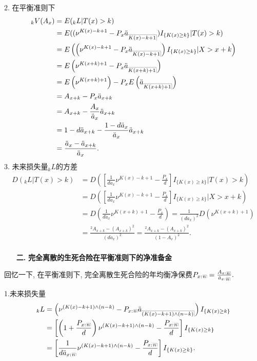 \documentclass[a4paper,openany, 10pt]{ctexbook}
\makeatletter
\newcommand{\hei}{\CJKfamily{hei}}      %
\def\z{\left}
\def\y{\right}
\DeclareRobustCommand{\annu}[1]{_{%
    \def\arraystretch{0}%
    \setlength\arraycolsep{1pt}%
    \setlength\arrayrulewidth{.2pt}%
    \begin{array}[b]{@{}c|}\hline
        \\[\arraycolsep]%
        \scriptstyle #1%
    \end{array}%
}}
\makeatother
\begin{document}
2. 在平衡准则下
\begin{align*}
    {}_kV(A_x)&=E({}_kL|T(x)>k) \\
                        &=E((\nu^{K(x)-k+1}-P_x \ddot a_{\annu {K(x)-k+1}})I_{\{K(x)\ge k\}}|T(x)>k)\\
                        &=E\z(\z(\nu^{K(x)-k+1}-P_x \ddot a_{\annu {K(x)-k+1}}\y)I_{\{K(x)\ge k\}}|X>x+k\y)\\
                        &=E\z(\nu^{K(x+k)+1}-P_x \ddot a_{\annu {K(x+k)+1}}\y)\\
                        &=E\z(\nu^{K(x+k)+1}\y)-P_x E\z(\ddot a_{\annu {K(x+k)+1}}\y)\\
                        &= A_{x+k}-P_x\ddot a_{x+k}\\
                        &= A_{x+k}-\frac{ A_x}{\ddot a_x}\ddot a_{x+k}\\
                        &=1-d\ddot a_{x+k}-\frac{1-d \ddot a_x}{\ddot a_x}\ddot a_{x+k}\\
                        &=\frac{\ddot a_x-\ddot a_{x+k}}{\ddot a_x}.
\end{align*}
3. 未来损失量$_kL$的方差
\begin{align*}
    D(_kL|T(x)>k) &=D\z(\z[\frac{1}{d\ddot a_x}\nu^{K(x)-k+1}-\frac{P_x }{d}\y]I_{\{K(x)\ge k\}}|T(x)>k\y)\\
                        &=D\z(\z[\frac{1}{d\ddot a_x}\nu^{K(x)-k+1}-\frac{P_x }{d}\y]I_{\{K(x)\ge k\}}|X>x+k\y)\\
                        &=D\z(\frac{1}{d\ddot a_x}\nu^{K(x+k)+1}-\frac{P_x }{d}\y)
                        =\frac{1}{(d\ddot a_x)^2}D(\nu^{K(x+k)+1})\\
                        &=\frac{{}^2 A_{x+k}-( A_{x+k})^2}{(d\ddot a_x)^2}=\frac{{}^2 A_{x+k}-( A_{x+k})^2}{(1-A_x)^2}.\\                 \end{align*}


\begin{itemize}
    \item[{\bf\hei 二.}]{\bf\hei 完全离散的生死合险在平衡准则下的净准备金}
\end{itemize}

回忆一下, 在平衡准则下, 完全离散生死合险的年均衡净保费$P_{x:}{}\annu{n}=\frac{A_{x:}{}\annu{n}}{\ddot a_{x:}{}\annu{n}}.$


1.未来损失量
\begin{align*}
    {}_kL&=\z(\nu^{(K(x)-k+1)\wedge (n-k)}-P_{x:}{}\annu{n} \ddot a_{\annu {(K(x)-k+1)\wedge (n-k)}}\y)I_{\{K(x)\ge k\}} \\
                        &=\z[\z(1+\frac{P_{x:}{}\annu{n} }{d}\y)\nu^{(K(x)-k+1)\wedge (n-k)}-\frac{P_{x:}{}\annu{n}}{d}\y] I_{\{K(x)\ge k\}}\\
                        &=\z[\frac{1}{d\ddot a_{x:}{}\annu{n}}\nu^{(K(x)-k+1)\wedge (n-k)}-\frac{P_{x:}{}\annu{n} }{d}\y]I_{\{K(x)\ge k\}}.
\end{align*}
\end{document}
